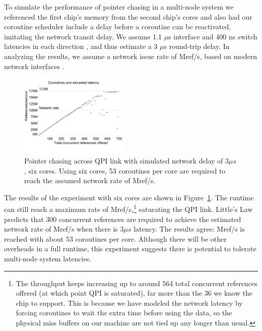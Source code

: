 \documentclass[10pt,nocopyrightspace]{sigplanconf}
\newcommand{\mrps}[1]{\unit[#1]{Mref/s}}
\begin{document}
To simulate the performance of pointer chasing in a multi-node system
we referenced the first chip's memory from the second chip's cores and also had our coroutine scheduler include a delay
before a coroutine can be reactivated, imitating the network transit
delay. We assume 1.1 $\mu$s interface and 400 ns switch latencies in each direction
\cite{infiniband, mellanox:site}, and thus estimate a 3 $\mu$s round-trip
delay. In analyzing the results, we assume a network issue rate of \mrps{100}, based on modern network interfaces \cite{mellanox:press}.

\begin{figure}[t]
  \begin{center}
    \includegraphics[width=0.47\textwidth]{figures/delay7800-remote-edited.pdf}
  \end{center}
  \vspace{-0.3in}
  \caption{Pointer chasing across QPI link with simulated network delay of $3\mu s$, six cores. Using six cores, 53 coroutines per core are required to reach the assumed network rate of \mrps{100}.}
  \label{fig:network-delay}
\end{figure}

The results of the experiment with six cores are shown in
Figure~\ref{fig:network-delay}. The runtime can still reach a
maximum rate of \mrps{173},\footnote{The throughput keeps increasing
  up to around 564 total concurrent references offered (at which point
  QPI is saturated), far more than the 36 we know the chip to
  support. This is because we have modeled the network latency by
  forcing coroutines to wait the extra time before using the data, so
  the physical miss buffers on our machine are not tied up any longer
  than usual.} saturating the QPI link.  Little's Law predicts that 300 concurrent references are required to achieve the estimated network rate of \mrps{100} when there is $3\mu s$ latency. The results agree: \mrps{100} is reached with about 53 coroutines per core. Although there will be other overheads in a full runtime, this experiment suggests there is potential to tolerate multi-node system latencies.
\end{document}
